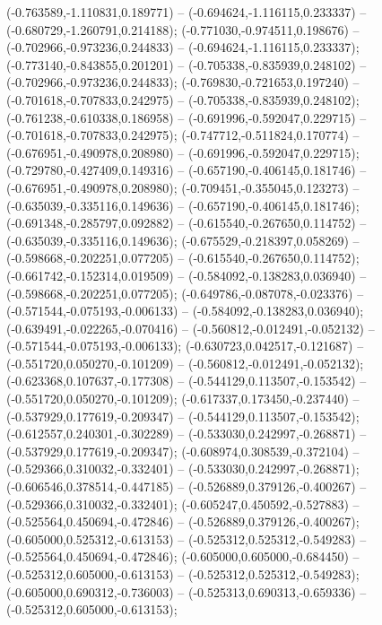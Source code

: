  (-0.763589,-1.110831,0.189771) -- (-0.694624,-1.116115,0.233337) -- (-0.680729,-1.260791,0.214188);
 (-0.771030,-0.974511,0.198676) -- (-0.702966,-0.973236,0.244833) -- (-0.694624,-1.116115,0.233337);
 (-0.773140,-0.843855,0.201201) -- (-0.705338,-0.835939,0.248102) -- (-0.702966,-0.973236,0.244833);
 (-0.769830,-0.721653,0.197240) -- (-0.701618,-0.707833,0.242975) -- (-0.705338,-0.835939,0.248102);
 (-0.761238,-0.610338,0.186958) -- (-0.691996,-0.592047,0.229715) -- (-0.701618,-0.707833,0.242975);
 (-0.747712,-0.511824,0.170774) -- (-0.676951,-0.490978,0.208980) -- (-0.691996,-0.592047,0.229715);
 (-0.729780,-0.427409,0.149316) -- (-0.657190,-0.406145,0.181746) -- (-0.676951,-0.490978,0.208980);
 (-0.709451,-0.355045,0.123273) -- (-0.635039,-0.335116,0.149636) -- (-0.657190,-0.406145,0.181746);
 (-0.691348,-0.285797,0.092882) -- (-0.615540,-0.267650,0.114752) -- (-0.635039,-0.335116,0.149636);
 (-0.675529,-0.218397,0.058269) -- (-0.598668,-0.202251,0.077205) -- (-0.615540,-0.267650,0.114752);
 (-0.661742,-0.152314,0.019509) -- (-0.584092,-0.138283,0.036940) -- (-0.598668,-0.202251,0.077205);
 (-0.649786,-0.087078,-0.023376) -- (-0.571544,-0.075193,-0.006133) -- (-0.584092,-0.138283,0.036940);
 (-0.639491,-0.022265,-0.070416) -- (-0.560812,-0.012491,-0.052132) -- (-0.571544,-0.075193,-0.006133);
 (-0.630723,0.042517,-0.121687) -- (-0.551720,0.050270,-0.101209) -- (-0.560812,-0.012491,-0.052132);
 (-0.623368,0.107637,-0.177308) -- (-0.544129,0.113507,-0.153542) -- (-0.551720,0.050270,-0.101209);
 (-0.617337,0.173450,-0.237440) -- (-0.537929,0.177619,-0.209347) -- (-0.544129,0.113507,-0.153542);
 (-0.612557,0.240301,-0.302289) -- (-0.533030,0.242997,-0.268871) -- (-0.537929,0.177619,-0.209347);
 (-0.608974,0.308539,-0.372104) -- (-0.529366,0.310032,-0.332401) -- (-0.533030,0.242997,-0.268871);
 (-0.606546,0.378514,-0.447185) -- (-0.526889,0.379126,-0.400267) -- (-0.529366,0.310032,-0.332401);
 (-0.605247,0.450592,-0.527883) -- (-0.525564,0.450694,-0.472846) -- (-0.526889,0.379126,-0.400267);
 (-0.605000,0.525312,-0.613153) -- (-0.525312,0.525312,-0.549283) -- (-0.525564,0.450694,-0.472846);
 (-0.605000,0.605000,-0.684450) -- (-0.525312,0.605000,-0.613153) -- (-0.525312,0.525312,-0.549283);
 (-0.605000,0.690312,-0.736003) -- (-0.525313,0.690313,-0.659336) -- (-0.525312,0.605000,-0.613153);
